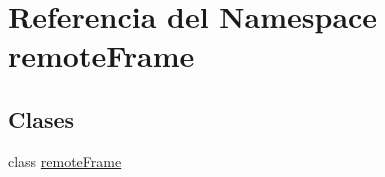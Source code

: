 \hypertarget{namespaceremoteFrame}{\section{Referencia del Namespace remote\+Frame}
\label{namespaceremoteFrame}
}
\subsection*{Clases}
\begin{DoxyCompactItemize}
\item 
class \hyperlink{classremoteFrame_1_1remoteFrame}{remote\+Frame}
\end{DoxyCompactItemize}
